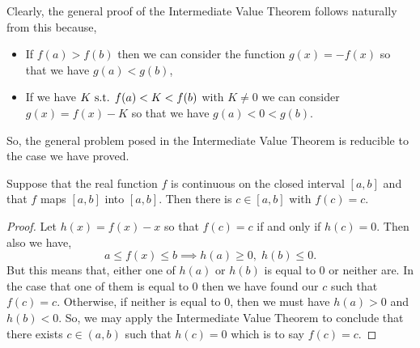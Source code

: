 \documentclass[../MathsNotesBase.tex]{subfiles}
\begin{document}
	Clearly, the general proof of the Intermediate Value Theorem follows naturally from this because,
	\begin{itemize}
		\item{If ${ f(a) > f(b) }$ then we can consider the function ${ g(x) = -f(x) }$ so that we have ${ g(a) < g(b) }$,}
		\item{If we have ${ K \text{ s.t. } f(a) < K < f(b) }$ with ${ K \neq 0 }$ we can consider ${ g(x) = f(x) - K }$ so that we have ${ g(a) < 0 < g(b) }$.}
	\end{itemize}
	So, the general problem posed in the Intermediate Value Theorem is reducible to the case we have proved.
	
	\bigskip
	\begin{corollary}
		\label{coro:continuous_func_mapping_interval_to_itself_has_invariant_point}
		Suppose that the real function $f$ is continuous on the closed interval ${ [a,b] }$ and that $f$ maps ${ [a,b] }$ into ${ [a,b] }$. Then there is ${ c \in [a,b] }$ with ${ f(c) = c }$.
	\end{corollary}
	\begin{proof}
		Let ${ h(x) = f(x) - x }$ so that ${ f(c) = c }$ if and only if ${ h(c) = 0 }$. Then also we have,
		\[ a \leq f(x) \leq b \implies h(a) \geq 0,\; h(b) \leq 0. \]
		But this means that, either one of $h(a)$ or $h(b)$ is equal to 0 or neither are. In the case that one of them is equal to 0 then we have found our $c$ such that ${ f(c) = c }$. Otherwise, if neither is equal to 0, then we must have ${ h(a) > 0 }$ and ${ h(b) < 0 }$. So, we may apply the Intermediate Value Theorem to conclude that there exists ${ c \in (a,b) }$ such that ${ h(c) = 0 }$ which is to say ${ f(c) = c }$.
	\end{proof}

	\bigskip
\end{document}
